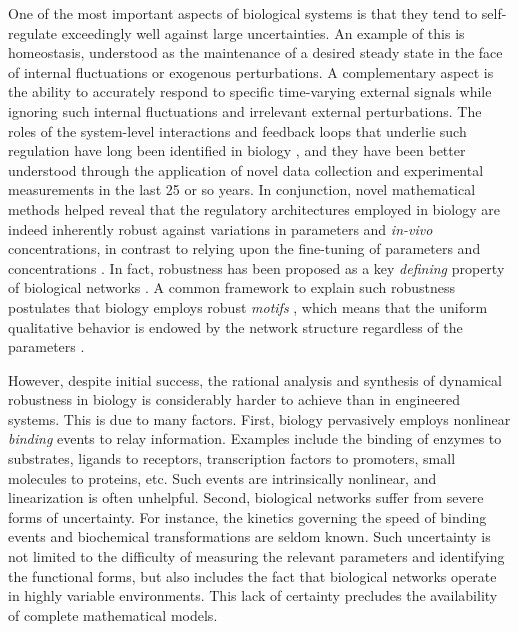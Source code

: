\documentclass[onefignum,onetabnum]{siamonline220329}
\begin{document}
One of the most important aspects of biological systems is that they tend to self-regulate exceedingly well against large uncertainties. An example of this is homeostasis, understood as the maintenance of a desired steady state in the face of internal fluctuations or exogenous perturbations. A complementary aspect is the ability to accurately respond to specific time-varying external signals while ignoring such internal fluctuations and irrelevant external perturbations. The roles of the system-level interactions and feedback loops that underlie such regulation have long been identified in biology \cite{umbarger56,savageau72}, and they have been better understood through the application of novel data collection and experimental measurements in the last 25 or so years. In conjunction, novel mathematical methods helped reveal that the regulatory architectures employed in biology are indeed inherently robust against variations in parameters and \emph{in-vivo} concentrations, in contrast to relying upon the fine-tuning of parameters and concentrations \cite{barkai97,alon99,stelling04}. In fact, robustness has been proposed as a key \emph{defining} property of biological networks \cite{morohashi02,kitano04}. A common framework to explain such robustness postulates that biology employs robust \emph{motifs} \cite{prill05}, which means that the uniform qualitative behavior is endowed by the network structure regardless of the parameters  \cite{bailey01,gupta22,araujo23}.
 
However, despite initial success, the rational analysis and synthesis of dynamical robustness in biology is considerably harder to achieve than in engineered systems. This is due to many factors.  First, biology pervasively employs nonlinear \textit{binding} events to relay information. Examples include the binding of enzymes to substrates, ligands to receptors, transcription factors to promoters, small molecules to proteins, etc. Such events are intrinsically nonlinear, and linearization is often unhelpful. Second, biological networks suffer from severe forms of uncertainty. For instance, the kinetics governing the speed of binding events and biochemical transformations are seldom known.  Such uncertainty is not limited to the difficulty of measuring the relevant parameters and identifying the functional forms, but also includes the fact that biological networks operate in highly variable environments. This lack of certainty precludes the availability of complete mathematical models.
\end{document}
